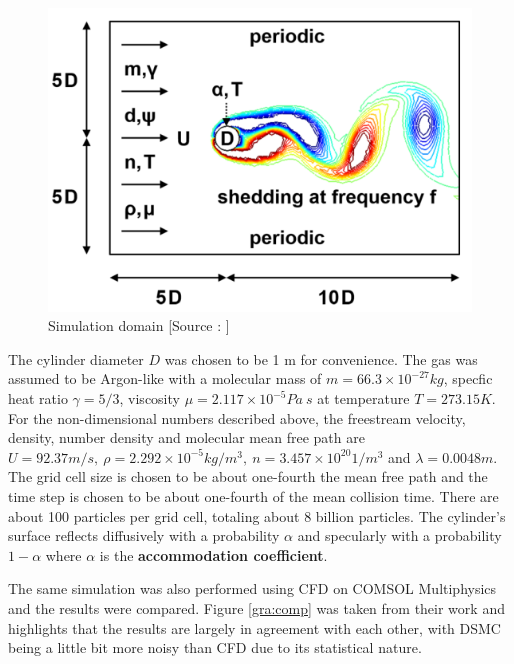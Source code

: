 \begin{figure}[H]
  \includegraphics[scale=0.5]{Pictures/Chapter_4_SPARTA/Sim.png}
  \centering
  \caption{Simulation domain [Source : \cite{gallis2021effect}]}
  \label{img:sim}
\end{figure}

\no The cylinder diameter $D$ was chosen to be 1 m for convenience. The gas was assumed to be Argon-like with a molecular mass of $m = 66.3 \times 10^{-27} kg$, specfic heat ratio $\gamma = 5/3$, viscosity $\mu = 2.117 \times 10^{-5} Pa \: s$ at temperature $T = 273.15K$. For the non-dimensional numbers described above,  the freestream velocity, density, number density and molecular mean free path are $U = 92.37 m/s, \: \rho = 2.292 \times 10^{-5} kg/m^3, \: n = 3.457 \times 10^{20} 1/m^3$ and $\lambda = 0.0048m$. The grid cell size is chosen to be about one-fourth the mean free path and the time step is chosen to be about one-fourth of the mean collision time. There are about 100 particles per grid cell, totaling about 8 billion particles. The cylinder's surface reflects diffusively with a probability $\alpha$ and specularly with a probability $1 - \alpha$ where $\alpha$ is the \textbf{accommodation coefficient}.

\no The same simulation was also performed using CFD on COMSOL Multiphysics and the results were compared. Figure \ref{gra:comp} was taken from their work \cite{gallus2021effect} and highlights that the results are largely in agreement with each other, with DSMC being a little bit more noisy than CFD due to its statistical nature.

